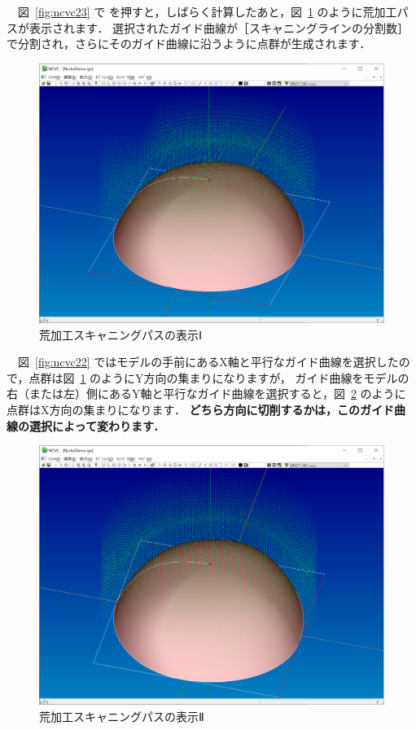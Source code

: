 　図~\ref{fig:ncvc23} で  を押すと，しばらく計算したあと，図~\ref{fig:ncvc24} のように荒加工パスが表示されます．
選択されたガイド曲線が［スキャニングラインの分割数］で分割され，さらにそのガイド曲線に沿うように点群が生成されます．

\begin{figure}[H]
\centering
\includegraphics[scale=0.5]{No2/fig/fig24.png}
\caption{荒加工スキャニングパスの表示Ⅰ}
\label{fig:ncvc24}
\end{figure}

　図~\ref{fig:ncvc22} ではモデルの手前にあるX軸と平行なガイド曲線を選択したので，点群は図~\ref{fig:ncvc24} のようにY方向の集まりになりますが，
ガイド曲線をモデルの右（または左）側にあるY軸と平行なガイド曲線を選択すると，図~\ref{fig:ncvc25} のように点群はX方向の集まりになります．
\textbf{どちら方向に切削するかは，このガイド曲線の選択によって変わります．}

\begin{figure}[H]
\centering
\includegraphics[scale=0.5]{No2/fig/fig25.png}
\caption{荒加工スキャニングパスの表示Ⅱ}
\label{fig:ncvc25}
\end{figure}
